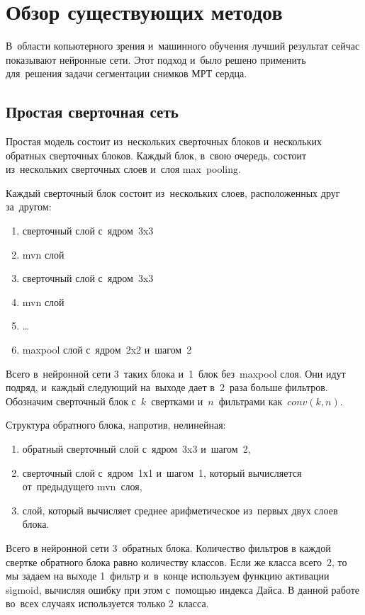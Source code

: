 \section{Обзор существующих методов}

В~области копьютерного зрения и~машинного обучения лучший результат сейчас показывают нейронные сети. Этот подход и~было решено применить для~решения задачи сегментации снимков МРТ сердца.

\subsection{Простая сверточная сеть}
 
Простая модель состоит из~нескольких сверточных блоков и~нескольких обратных сверточных блоков. Каждый блок, в~свою очередь, состоит из~нескольких сверточных слоев и~слоя max~pooling. 

Каждый сверточный блок состоит из~нескольких слоев, расположенных друг за~другом:

\begin{enumerate}
  \item сверточный слой с~ядром~3x3
  \item mvn слой
  \item сверточный слой с~ядром~3x3
  \item mvn слой
  \item \dots
  \item maxpool слой с~ядром~2x2 и~шагом~2
\end{enumerate}

Всего в~нейронной сети 3~таких блока и~1~блок без~maxpool слоя. Они идут подряд, и~каждый следующий на~выходе дает в~2~раза больше фильтров. Обозначим сверточный блок с~$k$~свертками и~$n$~фильтрами как~$conv(k,n)$.

Структура обратного блока, напротив, нелинейная:

\begin{enumerate}
	\item обратный сверточный слой с~ядром~3x3 и~шагом~2,
	\item сверточный слой с~ядром~1х1 и~шагом~1, который вычисляется от~предыдущего mvn~слоя,
	\item слой, который вычисляет среднее арифметическое из~первых двух слоев блока.
\end{enumerate}

Всего в нейронной сети 3~обратных блока. Количество фильтров в каждой свертке обратного блока равно количеству классов. Если же класса всего~2, то мы задаем на выходе 1~фильтр и~в~конце используем функцию активации sigmoid, вычисляя ошибку при этом с~помощью индекса Дайса. В данной работе во~всех случаях используется только 2~класса.

